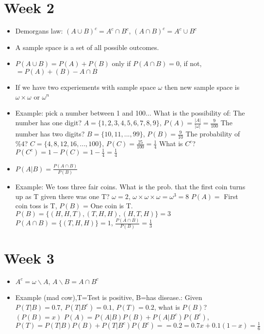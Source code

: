 \documentclass[12pt]{article}
\begin{document}
    \section{Week 2}
    \begin{itemize}
        \setlength\itemsep{0.1em}
        \item Demorgans law: $(A \cup B)^c = A^c \cap B^c$, $(A \cap B)^c = A^c \cup B^c$
        \item A sample space is a set of all possible outcomes.
        \item $P(A \cup B) = P(A) + P(B)$ only if $P (A \cap B) = 0$, if not, $= P(A) + (B) - A \cap B$
        \item If we have two experiements with sample space $\omega$ then new sample space is $ \omega \times \omega $ or $ \omega ^n $
        \item Example: pick a number between 1 and 100... What is the possibility of: \newline
            The number has one digit? $A=\{1,2,3,4,5,6,7,8,9\}$, $P(A) = \frac{|A|}{|\omega|} = \frac{9}{100}$ \newline
            The number has two digits? $B=\{10,11,...,99\}$, $P(B) = \frac{9}{10}$ \newline
            The probability of $ \% 4$? $C=\{4,8,12,16,...,100\}$, $P(C) = \frac{25}{100} = \frac{1}{4}$ \newline
            What is $C^c$? $P(C^c) = 1 - P(C) = 1 - \frac{1}{4} = \frac{1}{4}$
        \item $P(A|B) = \frac{P(A \cap B)}{P(B)}$
        \item Example: We toss three fair coins. What is the prob. that the first coin turns up as T given there was one T? \newline
            $\omega = 2$, $\omega \times \omega \times \omega = \omega^3 = 8$ \newline
            $P(A) =$ First coin toss is T, $P(B)$ = One coin is T. \newline
            $P(B) = \{(H,H,T),(T,H,H),(H,T,H)\} = 3$ \newline
            $P(A \cap B) = \{(T,H,H)\}  = 1$, $\frac{P(A \cap B)}{P(B)} = \frac{1}{3}$
    \end{itemize}
    \section{Week 3}
    \begin{itemize}
        \setlength\itemsep{0.1em}
        \item $A^c = \omega \backslash A$, $A \backslash B = A \cap B^c$
        \item Example (mad cow),T=Test is positive, B=has disease.: Given $P(T|B) = 0.7$, $P(T|B^c) = 0.1$, $P(T) = 0.2$, what is $P(B)$? $(P(B) = x)$ \newline
            $P(A) = P(A|B)P(B) + P(A|B^c)P(B^c)$, $P(T) = P(T|B)P(B) + P(T|B^c)P(B^c) == 0.2 = 0.7x + 0.1(1-x) = \frac{1}{6}$
    \end{itemize}
\end{document}

